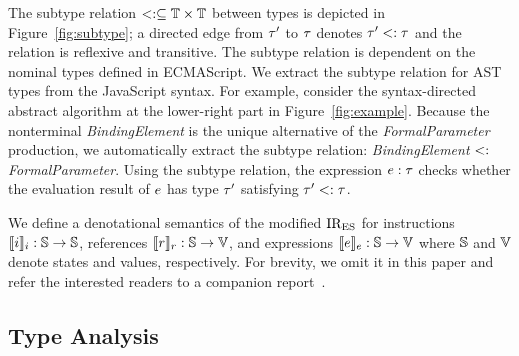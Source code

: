 \begin{figure}[H]
  \centering
  \vspace*{-0.5em}
  \vspace*{-0.5em}
\end{figure}

The subtype relation $<: \subseteq \mathbb{T} \times \mathbb{T}$ between types is
depicted in Figure~\ref{fig:subtype}; a directed edge from $\tau'$ to $\tau$
denotes $\tau' <: \tau$ and the relation is reflexive and transitive.  The
subtype relation is dependent on the nominal types defined in ECMAScript.  We
extract the subtype relation for AST types from the JavaScript syntax.
For example, consider the syntax-directed abstract
algorithm at the lower-right part in Figure~\ref{fig:example}.
Because the nonterminal \textit{BindingElement} is the unique alternative of the
\textit{FormalParameter} production, we automatically extract the subtype
relation: \textit{BindingElement} $<:$ \textit{FormalParameter}. Using
the subtype relation, the expression $e: \tau$ checks whether the
evaluation result of $e$ has type $\tau'$ satisfying $\tau' <: \tau$.

We define a denotational semantics of the modified ${\text{IR}_\text{ES}}$ for instructions
$\llbracket{i}\rrbracket_i: \mathbb{S} \rightarrow \mathbb{S}$, references $\llbracket{r}\rrbracket_r: \mathbb{S}
\rightarrow \mathbb{V}$, and expressions $\llbracket{e}\rrbracket_e: \mathbb{S} \rightarrow \mathbb{V}$
where $\mathbb{S}$ and $\mathbb{V}$ denote states and values, respectively.
For brevity, we omit it in this paper and refer the
interested readers to a companion report~.


\subsection{Type Analysis}\label{sec:analysis}

